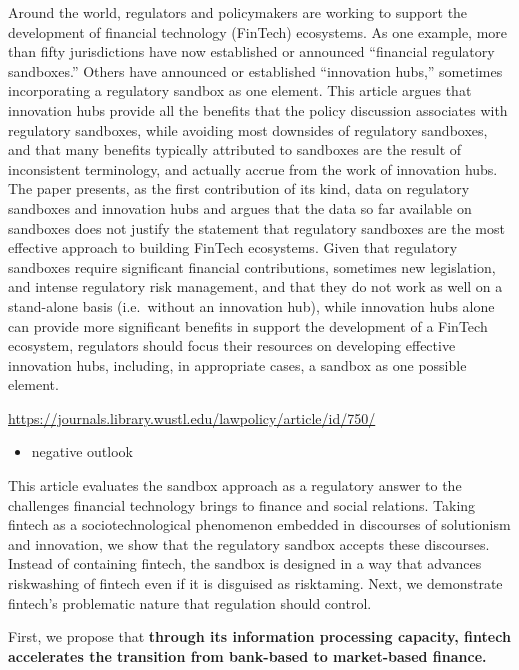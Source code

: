 \documentclass[
]{book}
\providecommand{\tightlist}{%
  \setlength{\itemsep}{0pt}\setlength{\parskip}{0pt}}
\begin{document}
\citet{buckley2020building}
Around the world, regulators and policymakers are working to support the development of financial technology (FinTech) ecosystems. As one example, more than fifty jurisdictions have now established or announced ``financial regulatory sandboxes.'' Others have announced or established ``innovation hubs,'' sometimes incorporating a regulatory sandbox as one element. This article argues that innovation hubs provide all the benefits that the policy discussion associates with regulatory sandboxes, while avoiding most downsides of regulatory sandboxes, and that many benefits typically attributed to sandboxes are the result of inconsistent terminology, and actually accrue from the work of innovation hubs. The paper presents, as the first contribution of its kind, data on regulatory sandboxes and innovation hubs and argues that the data so far available on sandboxes does not justify the statement that regulatory sandboxes are the most effective approach to building FinTech ecosystems. Given that regulatory sandboxes require significant financial contributions, sometimes new legislation, and intense regulatory risk management, and that they do not work as well on a stand-alone basis (i.e.~without an innovation hub), while innovation hubs alone can provide more significant benefits in support the development of a FinTech ecosystem, regulators should focus their resources on developing effective innovation hubs, including, in appropriate cases, a sandbox as one possible element.

\url{https://journals.library.wustl.edu/lawpolicy/article/id/750/}

\begin{itemize}
\tightlist
\item
  negative outlook
\end{itemize}

\citet{brown2022governing}
This article evaluates the sandbox approach as a regulatory answer to the challenges financial technology brings to finance and social relations. Taking fintech as a sociotechnological phenomenon embedded in discourses of solutionism and innovation, we show that the regulatory sandbox accepts these discourses. Instead of containing fintech, the sandbox is designed in a way that advances riskwashing of fintech even if it is disguised as risktaming. Next, we demonstrate fintech's problematic nature that regulation should control.

First, we propose that \textbf{through its information processing capacity, fintech accelerates the transition from bank-based to market-based finance.}
\end{document}
